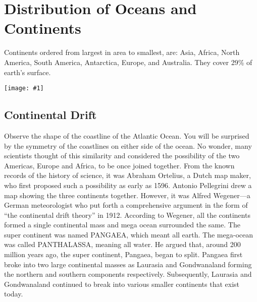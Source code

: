 \documentclass[8pt, a4paper, oneside, twocolumn]{extarticle}
\newcommand{\ph}[1]{
    \texttt{[image: \#1]}
}
\begin{document}
\section{Distribution of Oceans and Continents}
Continents ordered from largest in area to smallest, are: Asia, Africa, North America, South America, Antarctica, Europe, and Australia. They cover 29\% of earth's surface.

\ph{continents}

\subsection{Continental Drift}
Observe the shape of the coastline of the Atlantic Ocean. You will be surprised by the symmetry of the coastlines on either side of the ocean. No wonder, many scientists thought of this similarity and considered the possibility of the two Americas, Europe and Africa, to be once joined together. From the known records of the history of science, it was Abraham Ortelius, a Dutch map maker, who first proposed such a possibility as early as 1596. Antonio Pellegrini drew a map showing the three continents together. However, it was Alfred Wegener—a German meteorologist who put forth a comprehensive argument in the form of “the continental drift theory” in 1912. According to Wegener, all the continents formed a single continental mass and mega ocean surrounded the same. The super continent was named PANGAEA, which meant all earth. The mega-ocean was called PANTHALASSA, meaning all water. He argued that, around 200 million years ago, the super continent, Pangaea, began to split. Pangaea first broke into two large continental masses as Laurasia and Gondwanaland forming the northern and southern components respectively. Subsequently, Laurasia and Gondwanaland continued to break into various smaller continents that exist today.
\end{document}
